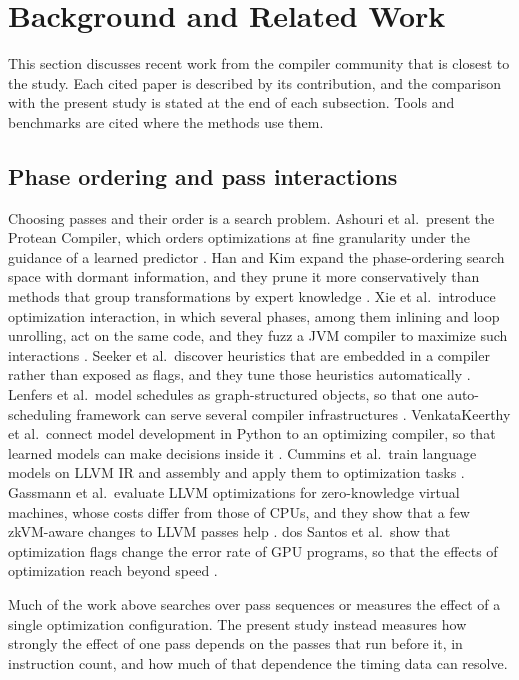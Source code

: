 \section{Background and Related Work}
\label{sec:background}

This section discusses recent work from the compiler community that is closest to the study. Each cited paper is described by its contribution, and the comparison with the present study is stated at the end of each subsection. Tools and benchmarks are cited where the methods use them.

\subsection{Phase ordering and pass interactions}

Choosing passes and their order is a search problem. Ashouri et al.\ present the Protean Compiler, which orders optimizations at fine granularity under the guidance of a learned predictor \cite{ashouri2026protean}. Han and Kim expand the phase-ordering search space with dormant information, and they prune it more conservatively than methods that group transformations by expert knowledge \cite{han2024exponentially}. Xie et al.\ introduce optimization interaction, in which several phases, among them inlining and loop unrolling, act on the same code, and they fuzz a JVM compiler to maximize such interactions \cite{xie2024validating}. Seeker et al.\ discover heuristics that are embedded in a compiler rather than exposed as flags, and they tune those heuristics automatically \cite{seeker2024revealing}. Lenfers et al.\ model schedules as graph-structured objects, so that one auto-scheduling framework can serve several compiler infrastructures \cite{lenfers2026schedgehammer}. VenkataKeerthy et al.\ connect model development in Python to an optimizing compiler, so that learned models can make decisions inside it \cite{venkatakeerthy2024the}. Cummins et al.\ train language models on LLVM IR and assembly and apply them to optimization tasks \cite{cummins2025llm}. Gassmann et al.\ evaluate LLVM optimizations for zero-knowledge virtual machines, whose costs differ from those of CPUs, and they show that a few zkVM-aware changes to LLVM passes help \cite{gassmann2026evaluating}. dos Santos et al.\ show that optimization flags change the error rate of GPU programs, so that the effects of optimization reach beyond speed \cite{santos2024assessing}.

Much of the work above searches over pass sequences or measures the effect of a single optimization configuration. The present study instead measures how strongly the effect of one pass depends on the passes that run before it, in instruction count, and how much of that dependence the timing data can resolve.

